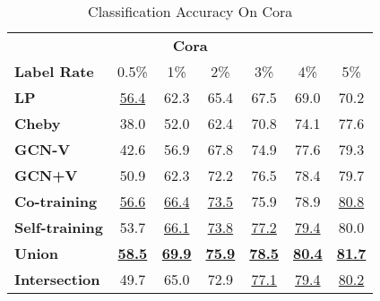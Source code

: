 \documentclass[letterpaper]{article} \usepackage{aaai18}  \usepackage{times}  \usepackage{helvet}  \usepackage{courier}  \usepackage{url}  \usepackage{graphicx}  \usepackage{algorithm}
\begin{document}
\begin{table}[t]
\centering
\small
\caption{Classification Accuracy On Cora}\label{tab:cora}
\begin{tabular}{l cccccc}
    \multicolumn{7}{c}{ \normalsize \textbf{Cora}} \\
\textbf{Label Rate} & 0.5\% & 1\% & 2\% & 3\% & 4\% & 5\% \\
    \midrule
    \textbf{LP}             & \underline{56.4} & 62.3 & 65.4 & 67.5 & 69.0 & 70.2 \\
\textbf{Cheby}          & 38.0 & 52.0 & 62.4 & 70.8 & 74.1 & 77.6 \\
    \textbf{GCN-V}          & 42.6 & 56.9 & 67.8 & 74.9 & 77.6 & 79.3 \\
    \textbf{GCN+V}          & 50.9 & 62.3 & 72.2 & 76.5 & 78.4 & 79.7 \\
    \midrule
    \textbf{Co-training}    & \underline{56.6} & \underline{66.4} & \underline{73.5} & 75.9 & 78.9 & \underline{80.8} \\
    \textbf{Self-training}  & 53.7 & \underline{66.1} & \underline{73.8} & \underline{77.2} & \underline{79.4} & 80.0 \\
    \textbf{Union}          & \underline{\textbf{58.5}} & \underline{\textbf{69.9}} & \underline{\textbf{75.9}} & \underline{\textbf{78.5}} & \underline{\textbf{80.4}} & \underline{\textbf{81.7}} \\
    \textbf{Intersection}   & 49.7 & 65.0 & 72.9 & \underline{77.1} & \underline{79.4} & \underline{80.2} \\
\end{tabular}
\end{table}
\end{document}
